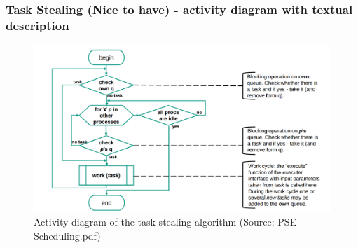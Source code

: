 \newpage
\subsubsection{Task Stealing (Nice to have) - activity diagram with textual description}
\vspace{1.5cm}
\begin{figure}[H]
	\includegraphics[width=15cm]{images/task_stealing_pap.jpg}
	\caption{Activity diagram of the task stealing algorithm (Source: PSE-Scheduling.pdf)}
\end{figure}
\newpage
